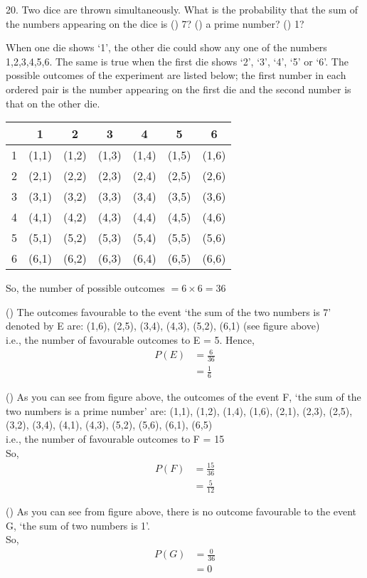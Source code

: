 \documentclass[]{article}
\begin{document}
\let\vec\mathbf

20. Two dice are thrown simultaneously. What is the probability that the sum of the numbers appearing on the dice is () 7? () a prime number? () 1?

\solution When one die shows `1', the other die could show any one of the numbers 1,2,3,4,5,6. The same is true when the first die shows `2', `3', `4', `5' or `6'. The possible outcomes of the experiment are listed below; the first number in each ordered pair is the number appearing on the first die and the second number is that on the other die.

\begin{table}[H]
\centering
\begin{tabular}{c|c c c c c c}
&1&2&3&4&5&6\\
\hline
1&(1,1)&(1,2)&(1,3)&(1,4)&(1,5)&(1,6)\\
2&(2,1)&(2,2)&(2,3)&(2,4)&(2,5)&(2,6)\\
3&(3,1)&(3,2)&(3,3)&(3,4)&(3,5)&(3,6)\\
4&(4,1)&(4,2)&(4,3)&(4,4)&(4,5)&(4,6)\\
5&(5,1)&(5,2)&(5,3)&(5,4)&(5,5)&(5,6)\\
6&(6,1)&(6,2)&(6,3)&(6,4)&(6,5)&(6,6)\\
\end{tabular}
\label{tab:outcomes}
\end{table}

So, the number of possible outcomes $=6 \times 6=36$

() The outcomes favourable to the event `the sum of the two numbers is 7' denoted by E are: (1,6), (2,5), (3,4), (4,3), (5,2), (6,1)  (see figure above) \\
i.e., the number of favourable outcomes to E = 5.
Hence,
\begin{align}
P(E) &= \frac{6}{36}\\
&= \frac{1}{6}
\end{align}

() As you can see from figure above, the outcomes of the event F, `the sum of the two numbers is a prime number' are: (1,1), (1,2), (1,4), (1,6), (2,1), (2,3), (2,5), (3,2), (3,4), (4,1), (4,3), (5,2), (5,6), (6,1), (6,5) \\
i.e., the number of favourable outcomes to F = 15 \\
So,
\begin{align}
P(F) &= \frac{15}{36}\\
&= \frac{5}{12}
\end{align}

() As you can see from figure above, there is no outcome favourable to the event G, `the sum of two numbers is 1'.\\
So,
\begin{align}
P(G) &= \frac{0}{36} \\
&= 0 
\end{align}
\end{document}
